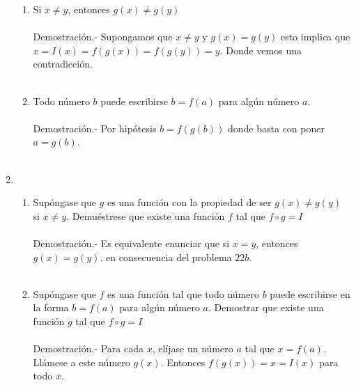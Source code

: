 \begin{enumerate}
	\begin{enumerate}[\bfseries (a)]

	    \item Si $x\neq y$, entonces $g(x)\neq g(y)$\\\\
		Demostración.-\; Supongamos que $x\neq y$ y $g(x)=g(y)$ esto implica que $x=I(x)=f(g(x))=f(g(y))=y$. Donde vemos una contradicción.\\\\

	    \item Todo número $b$ puede escribirse $b=f(a)$ para algún número $a$.\\\\
		Demostración.-\; Por hipótesis $b=f(g(b))$ donde basta con poner $a=g(b)$.\\\\

	\end{enumerate}

	\item 
	
	\begin{enumerate}[\bfseries (a)]

	    \item Supóngase que $g$ es una función con la propiedad de ser $g(x)\neq g(y)$ si $x\neq y$. Demuéstrese que existe una función $f$ tal que $f\circ g = I$\\\\
		Demostración.-\; Es equivalente enunciar que si $x=y$, entonces $g(x)=g(y)$. en consecuencia del problema $22b$.\\\\

	    \item Supóngase que $f$ es una función tal que todo número $b$ puede escribirse en la forma $b=f(a)$ para algún número $a$. Demostrar que existe una función $g$ tal que $f\circ g=I$\\\\
		Demostración.-\; Para cada $x$, elíjase un número $a$ tal que $x=f(a)$. Llámese a este número $g(x)$. Entonces $f(g(x))=x=I(x)$ para todo $x$.\\\\ 

	\end{enumerate}


\end{enumerate}
